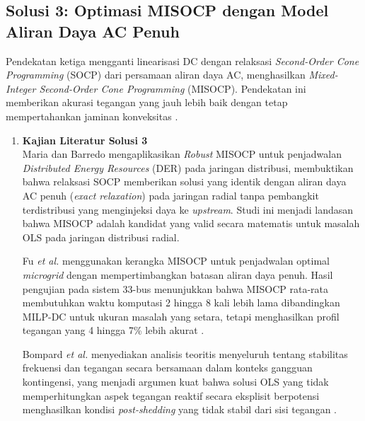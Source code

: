 \subsection{Solusi 3: Optimasi MISOCP dengan Model Aliran Daya AC Penuh}
\label{subsec:Solusi_3}

Pendekatan ketiga mengganti linearisasi DC dengan relaksasi \textit{Second-Order Cone Programming} (SOCP) dari persamaan aliran daya AC, menghasilkan \textit{Mixed-Integer Second-Order Cone Programming} (MISOCP). Pendekatan ini memberikan akurasi tegangan yang jauh lebih baik dengan tetap mempertahankan jaminan konveksitas \cite{Maria2021, Fu2019}.

\begin{enumerate}
\item[a.] \textbf{Kajian Literatur Solusi 3} \\
Maria dan Barredo \cite{Maria2021} mengaplikasikan \textit{Robust} MISOCP untuk penjadwalan \textit{Distributed Energy Resources} (DER) pada jaringan distribusi, membuktikan bahwa relaksasi SOCP memberikan solusi yang identik dengan aliran daya AC penuh (\textit{exact relaxation}) pada jaringan radial tanpa pembangkit terdistribusi yang menginjeksi daya ke \textit{upstream}. Studi ini menjadi landasan bahwa MISOCP adalah kandidat yang valid secara matematis untuk masalah OLS pada jaringan distribusi radial.

Fu \textit{et al.} \cite{Fu2019} menggunakan kerangka MISOCP untuk penjadwalan optimal \textit{microgrid} dengan mempertimbangkan batasan aliran daya penuh. Hasil pengujian pada sistem 33-bus menunjukkan bahwa MISOCP rata-rata membutuhkan waktu komputasi 2 hingga 8 kali lebih lama dibandingkan MILP-DC untuk ukuran masalah yang setara, tetapi menghasilkan profil tegangan yang 4 hingga 7\% lebih akurat \cite{Fu2019}.

Bompard \textit{et al.} \cite{Bompard2021} menyediakan analisis teoritis menyeluruh tentang stabilitas frekuensi dan tegangan secara bersamaan dalam konteks gangguan kontingensi, yang menjadi argumen kuat bahwa solusi OLS yang tidak memperhitungkan aspek tegangan reaktif secara eksplisit berpotensi menghasilkan kondisi \textit{post-shedding} yang tidak stabil dari sisi tegangan \cite{Bompard2021}.


\end{enumerate}
